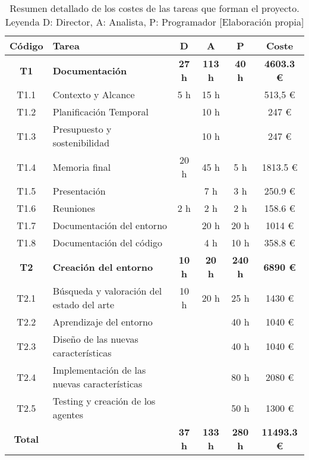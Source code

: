 \begin{table}[ht]
    \begin{center}
        \begin{tabular}{ c  l  c  c  c  c }
        \textbf{Código} & \textbf{Tarea} & \textbf{D} & \textbf{A} & \textbf{P} & \textbf{Coste}\\ \hline
\textbf{T1} & \textbf{Documentación} &  \textbf{27 h} & \textbf{113 h} & \textbf{40 h} & \textbf{4603.3 €}  \\ \hline
        T1.1 & Contexto y Alcance                           & 5 h   & 15 h  &       & 513,5 € \\
        T1.2 & Planificación Temporal                       &       & 10 h  &       & 247 € \\
        T1.3 & Presupuesto y sostenibilidad                 &       & 10 h  &       & 247 € \\
        T1.4 & Memoria final                                & 20 h  & 45 h  &  5 h  & 1813.5 € \\
        T1.5 & Presentación                                 &       & 7 h   &  3 h  & 250.9 € \\
        T1.6 & Reuniones                                    & 2 h   & 2 h   &  2 h  & 158.6 € \\ 
        T1.7 & Documentación del entorno                    &       & 20 h  & 20 h  & 1014 €\\ 
        T1.8 & Documentación del código                     &       & 4 h   & 10 h  & 358.8 € \\ 
        \hline
\textbf{T2} & \textbf{Creación del entorno} & \textbf{10 h} & \textbf{20 h} & \textbf{240 h} & \textbf{6890 €} \\ \hline
        T2.1 & Búsqueda y valoración del estado del arte    & 10 h  & 20 h  & 25 h  & 1430 € \\
        T2.2 & Aprendizaje del entorno                      &       &       & 40 h  & 1040 €\\
        T2.3 & Diseño de las nuevas características         &       &       & 40 h  & 1040 €\\
        T2.4 & Implementación de las nuevas características &       &       & 80 h  & 2080 €\\
        T2.5 & Testing y creación de los agentes            &       &       & 50 h  & 1300 €\\
         \hline
         \textbf{Total} & & \textbf{37 h} & \textbf{133 h} & \textbf{280 h} & \textbf{11493.3 €} \\
        \end{tabular}
        \caption{Resumen detallado de los costes de las tareas que forman el proyecto. Leyenda D: Director, A: Analista, P: Programador [Elaboración propia]}
        \label{tab:coste_tarea}
    \end{center}
\end{table}

